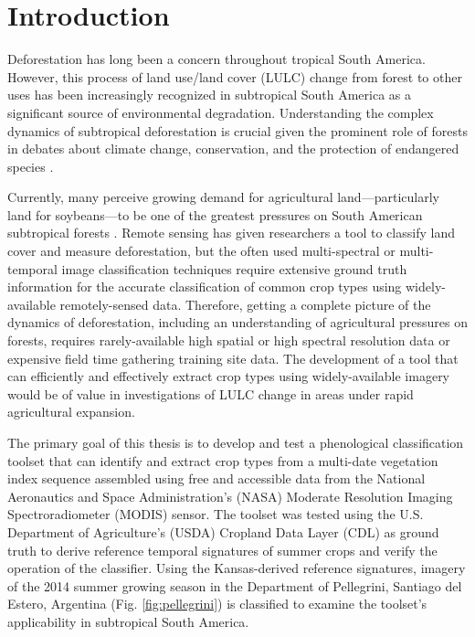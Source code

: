 \chapter{Introduction}

Deforestation has long been a concern throughout tropical South America. However, this process of land use/land cover (LULC) change from forest to other uses has been increasingly recognized in subtropical South America as a significant source of environmental degradation. Understanding the complex dynamics of subtropical deforestation is crucial given the prominent role of forests in debates about climate change, conservation, and the protection of endangered species \autocites{geist2002proximate}{zak2004do-subtropical}{bonnie2000counting}{houghton1994the-worldwide}{sala2000global}.

Currently, many perceive growing demand for agricultural land---particularly land for soybeans---to be one of the greatest pressures on South American subtropical forests \autocites{pengue2005transgenic}{grau2005agriculture}{altieri2006gm-soybean:}. Remote sensing has given researchers a tool to classify land cover and measure deforestation, but the often used multi-spectral or multi-temporal image classification techniques require extensive ground truth information for the accurate classification of common crop types using widely-available remotely-sensed data. Therefore, getting a complete picture of the dynamics of deforestation, including an understanding of agricultural pressures on forests, requires rarely-available high spatial or high spectral resolution data \autocite{senay2000using} or expensive field time gathering training site data. The development of a tool that can efficiently and effectively extract crop types using widely-available imagery would be of value in investigations of LULC change in areas under rapid agricultural expansion.

The primary goal of this thesis is to develop and test a phenological classification toolset that can identify and extract crop types from a multi-date vegetation index sequence assembled using free and accessible data from the National Aeronautics and Space Administration’s (NASA) Moderate Resolution Imaging Spectroradiometer (MODIS) sensor. The toolset was tested using the U.S. Department of Agriculture's (USDA) Cropland Data Layer (CDL)  as ground truth to derive reference temporal signatures of summer crops and verify the operation of the classifier. Using the Kansas-derived reference signatures, imagery of the 2014 summer growing season in the Department of Pellegrini, Santiago del Estero, Argentina (Fig. \ref{fig:pellegrini}) is classified to examine the toolset's applicability in subtropical South America.

